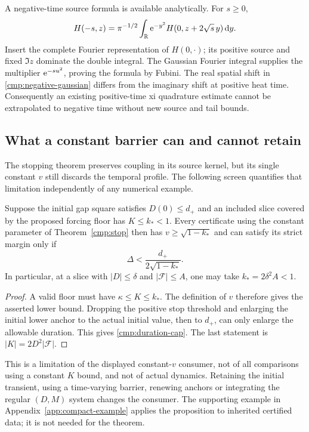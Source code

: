 A negative-time source formula is available analytically. For $s\ge0$,
\begin{equation}
 H(-s,z)=\pi^{-1/2}\int_\mathbb R\mathrm e^{-y^2}
                         H(0,z+2\sqrt{s}\,y)\,\mathrm d y.
 \label{cmp:negative-gaussian}
\end{equation}
Insert the complete Fourier representation of $H(0,\cdot)$; its positive
source and fixed $\Im z$ dominate the double integral. The Gaussian
Fourier integral supplies the multiplier $\mathrm e^{-s u^2}$, proving the
formula by Fubini. The real spatial shift in \eqref{cmp:negative-gaussian}
differs from the imaginary shift at positive heat time. Consequently an
existing positive-time xi quadrature estimate cannot be extrapolated to
negative time without new source and tail bounds.

\subsection{What a constant barrier can and cannot retain}

The stopping theorem preserves coupling in its source kernel, but its
single constant $v$ still discards the temporal profile. The following
screen quantifies that limitation independently of any numerical example.

\begin{proposition}
\label{cmp:small-slice}
Suppose the initial gap square satisfies $D(0)\le d_+$ and an included
slice covered by the proposed forcing floor has $K\le k_*<1$. Every
certificate using the constant parameter of Theorem~\ref{cmp:stop} then
has $v\ge\sqrt{1-k_*}$ and can satisfy its strict margin only if
\begin{equation}
 \Delta<\frac{d_+}{2\sqrt{1-k_*}}.
 \label{cmp:duration-cap}
\end{equation}
In particular, at a slice with $|D|\le\delta$ and
$|\mathcal F|\le A$, one may take $k_*=2\delta^2 A<1$.
\end{proposition}
\begin{proof}
A valid floor must have $\kappa\le K\le k_*$. The definition of $v$
therefore gives the asserted lower bound. Dropping the positive stop
threshold and enlarging the initial lower anchor to the actual initial
value, then to $d_+$, can only enlarge the allowable duration. This gives
\eqref{cmp:duration-cap}. The last statement is $|K|=2D^2|\mathcal F|$.
\end{proof}

This is a limitation of the displayed constant-$v$ consumer, not of all
comparisons using a constant $K$ bound, and not of actual dynamics.
Retaining the initial transient, using a time-varying barrier, renewing
anchors or integrating the regular $(D,M)$ system changes the consumer.
The supporting example in Appendix~\ref{app:compact-example} applies the
proposition to inherited certified data; it is not needed for the theorem.

